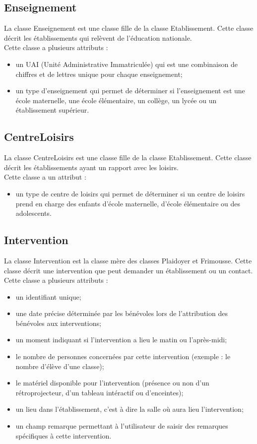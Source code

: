 \documentclass[asi, sansVersion]{picInsa}
\begin{document}
\subsection*{Enseignement}
La classe Enseignement est une classe fille de la classe Etablissement. Cette classe décrit les établissements qui relèvent de l'éducation nationale. \\
Cette classe a plusieurs attributs : 
\begin{itemize}
\item un UAI (Unité Administrative Immatriculée) qui est une combinaison de chiffres et de lettres unique pour chaque enseignement;
\item un type d'enseignement qui permet de déterminer si l'enseignement est une école maternelle, une école élémentaire, un collège, un lycée ou un établissement supérieur. 
\end{itemize} 


\subsection*{CentreLoisirs}
La classe CentreLoisirs est une classe fille de la classe Etablissement. Cette classe décrit les établissements ayant un rapport avec les loisirs. \\
Cette classe a un attribut : 
\begin{itemize}
\item un type de centre de loisirs qui permet de déterminer si un centre de loisirs prend en charge des enfants d'école maternelle, d'école élémentaire ou des adolescents.
\end{itemize}  

\subsection*{Intervention}
La classe Intervention est la classe mère des classes Plaidoyer et Frimousse. Cette classe décrit une intervention que peut demander un établissement ou un contact. \\
Cette classe a plusieurs attributs :
\begin{itemize}
\item un identifiant unique;
\item une date précise déterminée par les bénévoles lors de l'attribution des bénévoles aux interventions;
\item un moment indiquant si l'intervention a lieu le matin ou l'après-midi;
\item le nombre de personnes concernées par cette intervention (exemple : le nombre d'élève d'une classe);
\item le matériel disponible pour l'intervention (présence ou non d'un rétroprojecteur, d'un tableau intéractif ou d'enceintes);
\item un lieu dans l'établissement, c'est à dire la salle où aura lieu l'intervention;
\item un champ remarque permettant à l'utilisateur de saisir des remarques spécifiques à cette intervention. 
\end{itemize}
\end{document}
